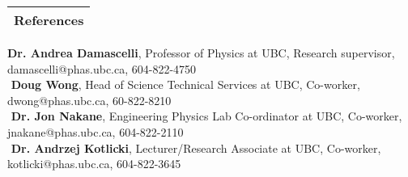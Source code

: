 \documentclass[letterpaper,12pt]{article}
\begin{document}

\noindent \Large \begin{tabular}{|p{12cm}|} \hline \textbf{References}\\ \hline \end{tabular} \normalsize
\linebreak
\linebreak
\noindent \textbf{Dr. Andrea Damascelli}, Professor of Physics at UBC, Research supervisor, damascelli@phas.ubc.ca, 604-822-4750 \\
$ $ \linebreak
\noindent \textbf{Doug Wong}, Head of Science Technical Services at UBC, Co-worker, dwong@phas.ubc.ca, 60-822-8210 \\
$ $ \linebreak
\noindent \textbf {Dr. Jon Nakane}, Engineering Physics Lab Co-ordinator at UBC, Co-worker, jnakane@phas.ubc.ca, 604-822-2110\\
$ $ \linebreak
\noindent \textbf {Dr. Andrzej Kotlicki}, Lecturer/Research Associate at UBC, Co-worker, kotlicki@phas.ubc.ca, 604-822-3645\\
\end{document}
